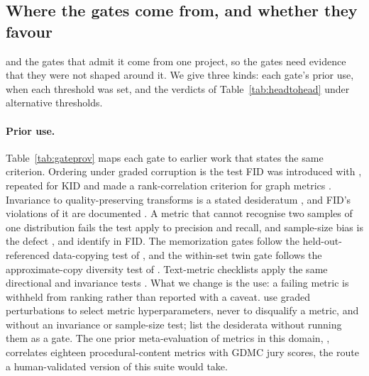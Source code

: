 \subsection{Where the gates come from, and whether they favour \vkid{}}
\label{app:gateprov}

\vkid{} and the gates that admit it come from one project, so the gates need
evidence that they were not shaped around it. We give three kinds: each gate's
prior use, when each threshold was set, and the verdicts of
Table~\ref{tab:headtohead} under alternative thresholds.

\paragraph{Prior use.} Table~\ref{tab:gateprov} maps each gate to earlier work
that states the same criterion. Ordering under graded corruption is the test
FID was introduced with \citep{heusel2017fid}, repeated for KID
\citep{binkowski2018kid} and made a rank-correlation criterion for graph
metrics \citep{obray2022graphmetrics,thompson2022evaluation}. Invariance to
quality-preserving transforms is a stated desideratum
\citep{borji2019prosandcons,borji2022newdevelopments}, and FID's violations of
it are documented \citep{kynkaanniemi2023imagenet,parmar2022aliased}. A metric
that cannot recognise two samples of one distribution fails the test
\citet{naeem2020prdc} apply to precision and recall, and sample-size bias is
the defect \citet{binkowski2018kid}, \citet{chong2020unbiasedfid} and
\citet{jayasumana2024cmmd} identify in FID. The memorization gates follow the
held-out-referenced data-copying test of \citet{meehan2020datacopying}, and the
within-set twin gate follows the approximate-copy diversity test of
\citet{jiralerspong2023fld}. Text-metric checklists apply the same
directional and invariance tests \citep{ribeiro2020checklist,sai2021perturbation}.
What we change is the use: a failing metric is withheld from ranking rather
than reported with a caveat. \citet{obray2022graphmetrics} use graded perturbations
to select metric hyperparameters, never to disqualify a metric, and without an
invariance or sample-size test; \citet{borji2019prosandcons} list the desiderata
without running them as a gate. The one prior meta-evaluation of metrics in this
domain, \citet{herve2021pcgmetrics}, correlates eighteen procedural-content metrics
with GDMC jury scores, the route a human-validated version of this suite would take.

